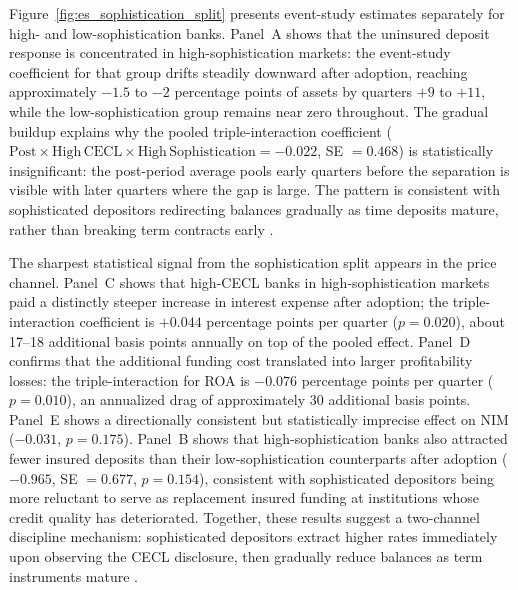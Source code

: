Figure~\ref{fig:es_sophistication_split} presents event-study estimates separately
for high- and low-sophistication banks.  Panel~A shows that the uninsured deposit
response is concentrated in high-sophistication markets: the event-study
coefficient for that group drifts steadily downward after adoption, reaching
approximately $-1.5$ to $-2$ percentage points of assets by quarters $+9$ to $+11$,
while the low-sophistication group remains near zero throughout.  The gradual
buildup explains why the pooled triple-interaction coefficient ($\mathrm{Post}
\times \mathrm{High\,CECL} \times \mathrm{High\,Sophistication} = -0.022$,
SE $= 0.468$) is statistically insignificant: the post-period average pools early
quarters before the separation is visible with later quarters where the gap is
large.  The pattern is consistent with sophisticated depositors redirecting
balances gradually as time deposits mature, rather than breaking term contracts
early \citep{iyer2016tale}.

The sharpest statistical signal from the sophistication split appears in the price
channel.  Panel~C shows that high-CECL banks in high-sophistication markets paid
a distinctly steeper increase in interest expense after adoption; the
triple-interaction coefficient is $+0.044$ percentage points per quarter
($p = 0.020$), about 17--18 additional basis points annually on top of the
pooled effect.  Panel~D confirms that the additional funding cost translated into
larger profitability losses: the triple-interaction for ROA is $-0.076$ percentage
points per quarter ($p = 0.010$), an annualized drag of approximately 30
additional basis points.  Panel~E shows a directionally consistent but
statistically imprecise effect on NIM ($-0.031$, $p = 0.175$).  Panel~B shows
that high-sophistication banks also attracted fewer insured deposits than their
low-sophistication counterparts after adoption ($-0.965$, SE $= 0.677$,
$p = 0.154$), consistent with sophisticated depositors being more reluctant to
serve as replacement insured funding at institutions whose credit quality has
deteriorated.  Together, these results suggest a two-channel discipline
mechanism: sophisticated depositors extract higher rates immediately upon
observing the CECL disclosure, then gradually reduce balances as term instruments
mature \citep{egan2017deposit}.
